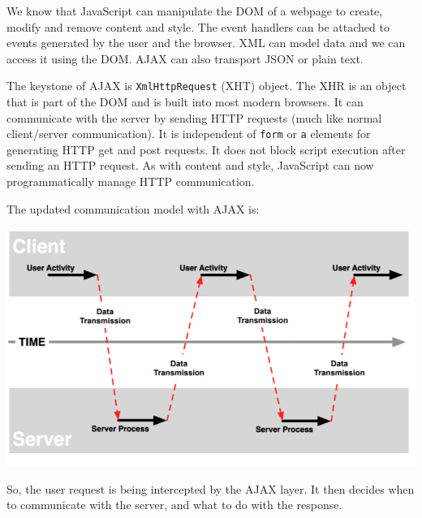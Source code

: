 \documentclass[a4paper, openany]{memoir}
\begin{document}
We know that JavaScript can manipulate the DOM of a webpage to create, modify and remove content and style. The event handlers can be attached to events generated by the user and the browser. XML can model data and we can access it using the DOM. AJAX can also transport JSON or plain text.

The keystone of AJAX is \texttt{XmlHttpRequest} (XHT) object. The XHR is an object that is part of the DOM and is built into most modern browsers. It can communicate with the server by sending HTTP requests (much like normal client/server communication). It is independent of \texttt{form} or \texttt{a} elements for generating HTTP get and post requests. It does not block script execution after sending an HTTP request. As with content and style, JavaScript can now programmatically manage HTTP communication.

The updated communication model with AJAX is:
\begin{center}
    \includegraphics[scale=0.5]{src/L16I1.PNG}
\end{center}
So, the user request is being intercepted by the AJAX layer. It then decides when to communicate with the server, and what to do with the response.
\end{document}
